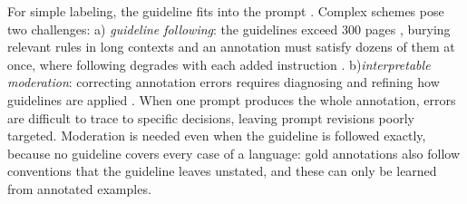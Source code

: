 
For simple labeling, the guideline fits into the prompt \citep{gilardi2023chatgpt,tan2024annotation}. Complex schemes pose two challenges: a) \emph{guideline following}: the \umr guidelines exceed 300 pages \citep{gysel2021design}, burying relevant rules in long contexts \citep{liu2024lost} and an annotation must satisfy dozens of them at once, where following degrades with each added instruction \citep{harada2025instructions}. b)\emph{interpretable moderation}: correcting annotation errors requires diagnosing and refining how guidelines are applied \citep{kim2026refining}. When one prompt produces the whole annotation, errors are difficult to trace to specific decisions, leaving prompt revisions poorly targeted. Moderation is needed even when the guideline is followed exactly, because no guideline covers every case of a language: gold annotations also follow conventions that the guideline leaves unstated, and these can only be learned from annotated examples.


